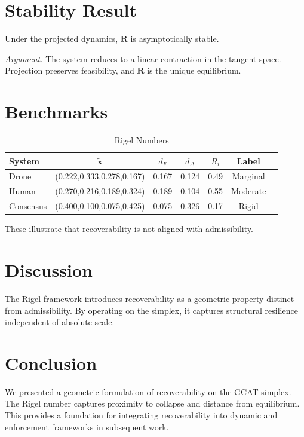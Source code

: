 \documentclass[letterpaper, 10 pt, conference]{ieeeconf}
\begin{document}
\section{Stability Result}

\begin{theorem}
Under the projected dynamics, $\mathbf{R}$ is asymptotically stable.
\end{theorem}

\textit{Argument.}
The system reduces to a linear contraction in the tangent space. Projection preserves feasibility, and $\mathbf{R}$ is the unique equilibrium.

\section{Benchmarks}

\begin{table}[h]
\centering
\caption{Rigel Numbers}
\begin{tabular}{lcccccc}
System & $\tilde{\mathbf{x}}$ & $d_F$ & $d_\Delta$ & $R_i$ & Label \\
\hline
Drone & (0.222,0.333,0.278,0.167) & 0.167 & 0.124 & 0.49 & Marginal \\
Human & (0.270,0.216,0.189,0.324) & 0.189 & 0.104 & 0.55 & Moderate \\
Consensus & (0.400,0.100,0.075,0.425) & 0.075 & 0.326 & 0.17 & Rigid \\
\end{tabular}
\end{table}

These illustrate that recoverability is not aligned with admissibility.

\section{Discussion}

The Rigel framework introduces recoverability as a geometric property distinct from admissibility. By operating on the simplex, it captures structural resilience independent of absolute scale.

\section{Conclusion}

We presented a geometric formulation of recoverability on the GCAT simplex. The Rigel number captures proximity to collapse and distance from equilibrium. This provides a foundation for integrating recoverability into dynamic and enforcement frameworks in subsequent work.
\end{document}
